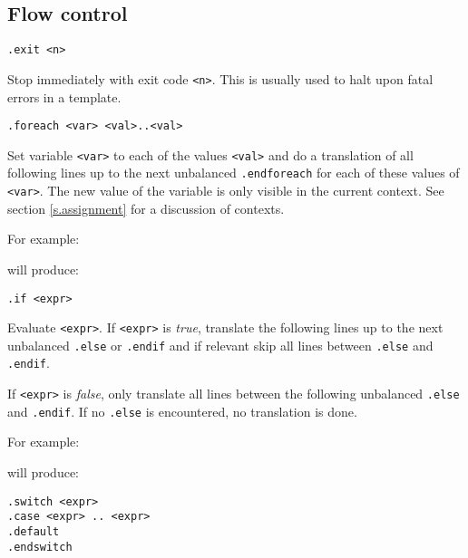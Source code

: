 \subsection{Flow control}
\begin{verbatim}
.exit <n>
\end{verbatim}
\begin{desc}
Stop {\Tm} immediately with exit code {\tt <n>}.
This is usually used to halt upon fatal errors in a template.
\end{desc}
\begin{verbatim}
.foreach <var> <val>..<val>
\end{verbatim}
\begin{desc}
Set variable {\tt <var>} to each of the values {\tt <val>} and do a
translation of all following lines up to the next unbalanced
{\tt .endforeach} for each of these values of {\tt <var>}.
The new value of the variable is only visible in the current context.
See section \ref{s.assignment} for a discussion of contexts.
\par
For example:
\begin{showfile}

\end{showfile}
will produce:
\begin{showfile}

\end{showfile}
\end{desc}
\begin{verbatim}
.if <expr>
\end{verbatim}
\begin{desc}
Evaluate {\tt <expr>}.
If {\tt <expr>} is {\it true},
translate the following lines up to the next unbalanced
{\tt .else} or {\tt .endif}
and if relevant skip all lines between {\tt .else} and {\tt .endif}.

If {\tt <expr>} is {\it false},
only translate all lines between the following unbalanced
{\tt .else} and {\tt .endif}.
If no {\tt .else} is encountered, no translation is done.
\par
For example:
\begin{showfile}

\end{showfile}
will produce:
\begin{showfile}

\end{showfile}
\end{desc}
\begin{verbatim}
.switch <expr>
.case <expr> .. <expr>
.default
.endswitch
\end{verbatim}

